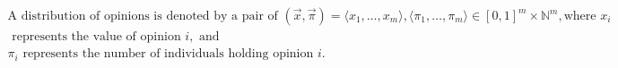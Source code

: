 \documentclass[preview]{standalone}
\begin{document}
\begin{align*}
\text{A distribution of opinions is denoted by a pair of }(\vec{x}, \vec{\pi}) = \langle x_1,\ldots,x_m \rangle, \langle \pi_1,\ldots,\pi_m \rangle \in [0,1]^m \times \mathbb{N}^m,\text{where } x_i \\\text{ represents the value of opinion } i, \text{ and }\\ \pi_i \text{ represents the number of individuals holding opinion } i.
\end{align*}
\end{document}
